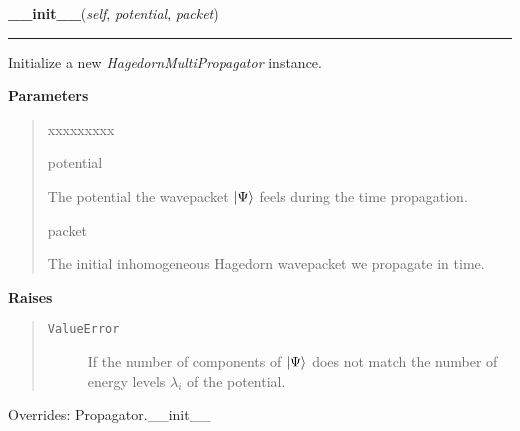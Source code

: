 \hspace{.8\funcindent}\begin{boxedminipage}{\funcwidth}

    \raggedright \textbf{\_\_init\_\_}(\textit{self}, \textit{potential}, \textit{packet})

    \vspace{-1.5ex}

    \rule{\textwidth}{0.5\fboxrule}
\setlength{\parskip}{2ex}
    Initialize a new \textit{HagedornMultiPropagator} instance.

\setlength{\parskip}{1ex}
      \textbf{Parameters}
      \vspace{-1ex}

      \begin{quote}
        \begin{Ventry}{xxxxxxxxx}

          \item[potential]

          The potential the wavepacket
          $\Ket{\Psi}$ feels during the
          time propagation.

          \item[packet]

          The initial inhomogeneous Hagedorn wavepacket we propagate in
          time.

        \end{Ventry}

      \end{quote}

      \textbf{Raises}
    \vspace{-1ex}

      \begin{quote}
        \begin{description}

          \item[\texttt{ValueError}]

          If the number of components of
          $\Ket{\Psi}$ does not match the
          number of energy levels $\lambda_i$ of the
          potential.

        \end{description}

      \end{quote}

      Overrides: Propagator.\_\_init\_\_

    \end{boxedminipage}

    \vspace{0.5ex}


